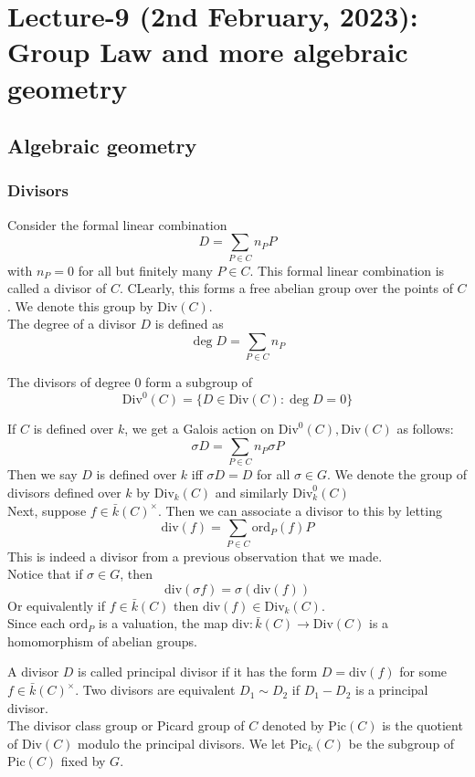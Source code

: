 \documentclass[oneside, 12pt]{scrbook}
\newcommand{\ord}{\mathrm{ord}}
\theoremstyle{theorem}
\begin{document}
\chapter{Lecture-9 (2nd February, 2023): Group Law and more algebraic geometry}

\section{Algebraic geometry}

\subsection{Divisors}

Consider the formal linear combination $$D = \sum_{P \in C} n_{P} P$$ with $n_{P} = 0$ for all but finitely many $P \in C$. This formal linear combination is called a divisor of $C$. CLearly, this forms a free abelian group over the points of $C$. We denote this group by $\mathrm{Div}(C)$. \\

The degree of a divisor $D$ is defined as $$\deg D = \sum_{P \in C} n_{P}$$

The divisors of degree $0$ form a subgroup of $$\mathrm{Div}^{0}(C) = \{D \in \mathrm{Div}(C): \deg D =0\}$$

If $C$ is defined over $k$, we get a Galois action on $\mathrm{Div}^{0}(C), \mathrm{Div}(C)$ as follows: $$\sigma D = \sum_{P \in C} n_{P} \sigma P$$
Then we say $D$ is defined over $k$ iff $\sigma D=D$ for all $\sigma \in G$. We denote the group of divisors defined over $k$ by $\mathrm{Div}_{k}(C)$ and similarly $\mathrm{Div}_{k}^{0}(C)$\\

Next, suppose $f \in \bar{k}(C)^{\times}$. Then we can associate a divisor to this by letting $$\mathrm{div}(f) =\sum_{P \in C} \ord_{P}(f) P$$ This is indeed a divisor from a previous observation that we made. \\

Notice that if $\sigma \in G$, then $$\mathrm{div}(\sigma f) = \sigma (\mathrm{div}(f))$$ Or equivalently if $f \in \bar{k}(C)$ then $\mathrm{div}(f) \in \mathrm{Div}_{k}(C)$. \\

Since each $\ord_{P}$ is a valuation, the map $\mathrm{div}: \bar{k}(C) \rightarrow \mathrm{Div}(C)$ is a homomorphism of abelian groups. 

\begin{definition}
A divisor $D$ is called principal divisor if it has the form $D = \mathrm{div}(f)$ for some $f \in \bar{k}(C)^{\times}$. Two divisors are equivalent $D_{1} \sim D_{2}$ if $D_{1} - D_{2}$ is a principal divisor. \\

The divisor class group or Picard group of $C$ denoted by $\mathrm{Pic}(C)$ is the quotient of $\mathrm{Div}(C)$ modulo the principal divisors. We let $\mathrm{Pic}_{k}(C)$ be the subgroup of $\mathrm{Pic}(C)$ fixed by $G$. 
\end{definition}
\end{document}
